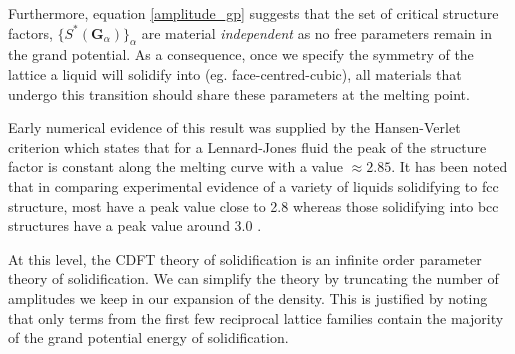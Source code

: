 %
Furthermore, equation \ref{amplitude_gp} suggests that the set of critical
structure factors, $\lbrace S^*(\mathbf{G}_\alpha)\rbrace_\alpha$ are material
\textit{independent} as no free parameters remain in the grand potential.  As a
consequence, once we specify the symmetry of the lattice a liquid will solidify
into (eg. face-centred-cubic), all materials that undergo this transition
should share these parameters at the melting point. 

Early numerical evidence of this result was supplied by the Hansen-Verlet
criterion \cite{HANSEN69} which states that for a Lennard-Jones fluid the peak
of the structure factor is constant along the melting curve with a value
$\approx 2.85$. It has been noted that in comparing experimental evidence of a
variety of liquids solidifying to fcc structure, most have a peak value close
to 2.8 whereas those solidifying into bcc structures have a peak value around
3.0 \cite{RAMAKRISHNAN79}.

At this level, the CDFT theory of solidification is an infinite order
parameter theory of solidification. We can simplify the theory by truncating
the number of amplitudes we keep in our expansion of the density. This is
justified by noting that only terms from the first few reciprocal lattice families contain the
majority of the grand potential energy of solidification\cite{RAMAKRISHNAN79}.

